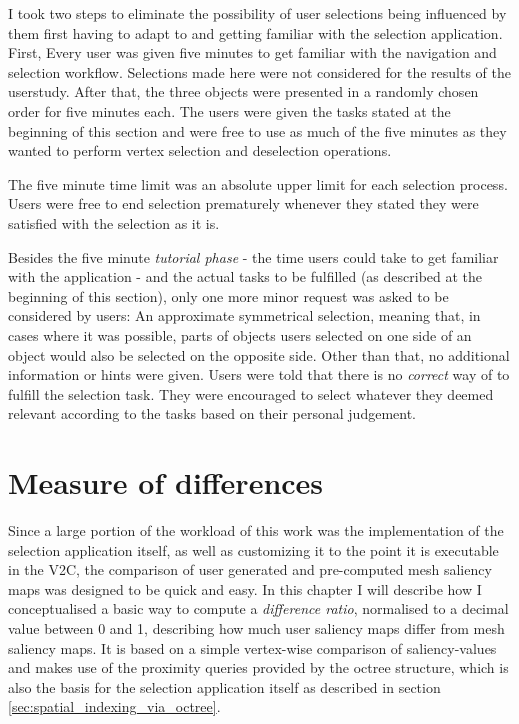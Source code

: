 I took two steps to eliminate the possibility of user selections being influenced by them first having to adapt to and getting familiar with the selection application. First, Every user was given five minutes to get familiar with the navigation and selection workflow. Selections made here were not considered for the results of the userstudy. After that, the three objects were presented in a randomly chosen order for five minutes each. The users were given the tasks stated at the beginning of this section and were free to use as much of the five minutes as they wanted to perform vertex selection and deselection operations.

The five minute time limit was an absolute upper limit for each selection process. Users were free to end selection prematurely whenever they stated they were satisfied with the selection as it is.

Besides the five minute \textit{tutorial phase} - the time users could take to get familiar with the application - and the actual tasks to be fulfilled (as described at the beginning of this section), only one more minor request was asked to be considered by users: An approximate symmetrical selection, meaning that, in cases where it was possible, parts of objects users selected on one side of an object would also be selected on the opposite side. Other than that, no additional information or hints were given. Users were told that there is no \textit{correct} way of to fulfill the selection task. They were encouraged to select whatever they deemed relevant according to the tasks based on their personal judgement.

	\section {Measure of differences}
	\label{sec:measure_of_difference}
Since a large portion of the workload of this work was the implementation of the selection application itself, as well as customizing it to the point it is executable in the V2C, the comparison of user generated and pre-computed mesh saliency maps was designed to be quick and easy. In this chapter I will describe how I conceptualised a basic way to compute a \textit{difference ratio}, normalised to a decimal value between 0 and 1, describing how much user saliency maps differ from mesh saliency maps. It is based on a simple vertex-wise comparison of saliency-values and makes use of the proximity queries provided by the octree structure, which is also the basis for the selection application itself as described in section \ref{sec:spatial_indexing_via_octree}.

